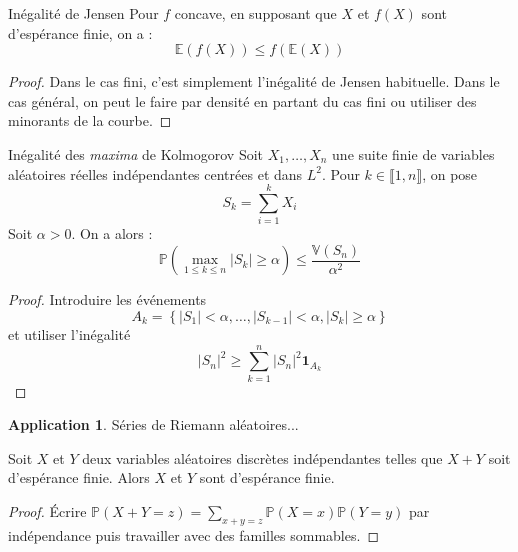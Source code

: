 \documentclass[french]{article}
\renewcommand{\P}{\mathbb{P}}
\newcommand{\E}{\mathbb{E}}
\newcommand{\V}{\mathbb{V}}
\theoremstyle{definition}
\newtheorem*{app}{Application}
\begin{document}
\begin{lem}{Inégalité de Jensen}
	Pour $f$ concave, en supposant que $X$ et $f(X)$ sont d'espérance finie, on a : $$\E(f(X))\leqslant f(\E(X))$$
\end{lem}
\begin{proof}
	Dans le cas fini, c'est simplement l'inégalité de Jensen habituelle. Dans le cas général, on peut le faire par densité en partant du cas fini ou utiliser des minorants de la courbe. 
\end{proof}

\begin{lem}{Inégalité des \textit{maxima} de Kolmogorov}
	Soit $X_1,\ldots,X_n$ une suite finie de variables aléatoires réelles indépendantes centrées et dans $L^2$. Pour $k\in\llbracket1,n\rrbracket$, on pose $$S_k=\sum_{i=1}^{k}X_i$$ Soit $\alpha>0$. On a alors : $$\P\left(\underset{1\leqslant k\leqslant n}{\max}\lvert S_k\rvert\geqslant\alpha\right)\leqslant\frac{\V(S_n)}{\alpha^2}$$
\end{lem}
\begin{proof}
	Introduire les événements $$A_k=\left\{\lvert S_1\rvert <\alpha,\ldots,\lvert S_{k-1}\rvert<\alpha,\lvert S_k\rvert\geqslant\alpha\right\}$$ et utiliser l'inégalité $$\lvert S_n\rvert^2\geqslant\sum_{k=1}^{n}\lvert S_n\rvert^2\mathbf{1}_{A_k}$$
\end{proof}
\begin{app}
	Séries de Riemann aléatoires...
\end{app}

\begin{lem}{}
	Soit $X$ et $Y$ deux variables aléatoires discrètes indépendantes telles que $X+Y$ soit d'espérance finie. Alors $X$ et $Y$ sont d'espérance finie.
\end{lem}
\begin{proof}
	Écrire $\P(X+Y=z)=\displaystyle\sum_{x+y=z}\P(X=x)\P(Y=y)$ par indépendance puis travailler avec des familles sommables.
\end{proof}

\end{document}
